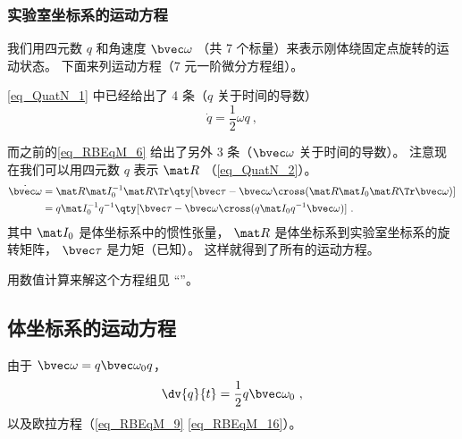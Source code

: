 
\begin{issues}
\issueAbstract
\end{issues}


\subsubsection{实验室坐标系的运动方程}
我们用四元数 $q$ 和角速度 $\bvec \omega$ （共 7 个标量）来表示刚体绕固定点旋转的运动状态。 下面来列运动方程（7 元一阶微分方程组）。

\autoref{eq_QuatN_1}  中已经给出了 4 条（$q$ 关于时间的导数）
\begin{equation}
\dot{q} = \frac12 \omega q~,
\end{equation}

而之前的\autoref{eq_RBEqM_6}  给出了另外 3 条（$\bvec\omega$ 关于时间的导数）。 注意现在我们可以用四元数 $q$ 表示 $\mat R$ （\autoref{eq_QuatN_2}）。
\begin{equation}
\begin{aligned}
\dot{\bvec \omega} &= \mat R \mat I_0^{-1} \mat R\Tr \qty[\bvec \tau  - \bvec\omega\cross(\mat R \mat I_0 \mat R\Tr \bvec\omega)]\\
&= q \mat I_0^{-1} q^{-1} \qty[\bvec \tau  - \bvec\omega\cross(q \mat I_0 q^{-1}\bvec\omega)]~.
\end{aligned}
\end{equation}
其中 $\mat I_0$ 是体坐标系中的惯性张量， $\mat R$ 是体坐标系到实验室坐标系的旋转矩阵， $\bvec\tau$ 是力矩（已知）。 这样就得到了所有的运动方程。

用数值计算来解这个方程组见 “”。

\subsection{体坐标系的运动方程}
由于 $\bvec\omega = q\bvec\omega_0 q$，
\begin{equation}
\dv{q}{t} = \frac12 q \bvec \omega_0~,
\end{equation}
以及欧拉方程（\autoref{eq_RBEqM_9}  \autoref{eq_RBEqM_16}）。
